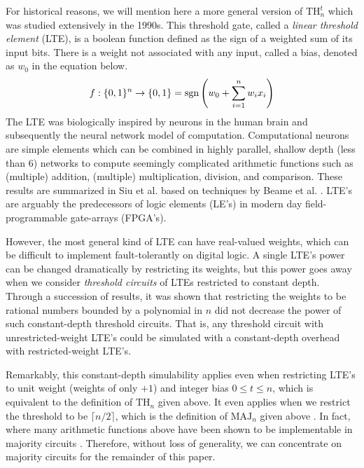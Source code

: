 For historical reasons, we will mention here a more general
version of $\text{TH}^t_n$ which was studied extensively in
the 1990s. This threshold gate, 
called a \emph{linear threshold element} (LTE), is a boolean
function defined as
the sign of a weighted sum of its input bits. There is a weight
not associated with any input, called a bias,
denoted as $w_0$ in the equation below.
%
\begin{equation}
f:\{0,1\}^n \rightarrow \{0,1\} = \text{sgn}\left( w_0 + \sum_{i=1}^n w_i x_i \right)
\end{equation}
%
The LTE was biologically inspired by neurons in the human brain and
subsequently the neural network model of computation. Computational
neurons are simple elements which can be combined in highly parallel,
shallow depth (less than $6$) networks to compute seemingly complicated
arithmetic functions such as (multiple) addition, (multiple) multiplication,
division, and comparison. These results are summarized in Siu et al. \cite{Siu1993}
based on techniques by Beame et al. \cite{Beame1986}. LTE's are arguably the
predecessors of logic elements (LE's) in modern day field-programmable
gate-arrays (FPGA's).

However, the most general kind of LTE can have real-valued weights,
which can be difficult to implement fault-tolerantly on digital logic.
A single LTE's power can be changed dramatically by restricting
its weights, but this power goes away when we consider \emph{threshold circuits}
of LTEs restricted to constant depth.
Through a succession of results, it was shown that restricting the weights
to be rational numbers bounded by a polynomial in $n$ \cite{Siu1991a}
did not decrease the power of such constant-depth threshold circuits.
That is, any threshold circuit with unrestricted-weight LTE's could be simulated
with a constant-depth overhead with restricted-weight LTE's.

Remarkably, this constant-depth simulability applies even when restricting
LTE's to unit weight (weights of only $+1$) and integer bias $0 \le t \le n$,
which is equivalent to the definition of $\text{TH}_n$ given above. It
even applies when we restrict the threshold to be $\lceil n/2 \rceil$, which
is the definition of $\text{MAJ}_n$ given above \cite{Goldmann1994}.
In fact, where many arithmetic functions above have been shown to
be implementable in majority circuits \cite{Reif1992,Yeh1996}.
Therefore, without loss of generality, we can concentrate on
majority circuits for the remainder of this paper.

